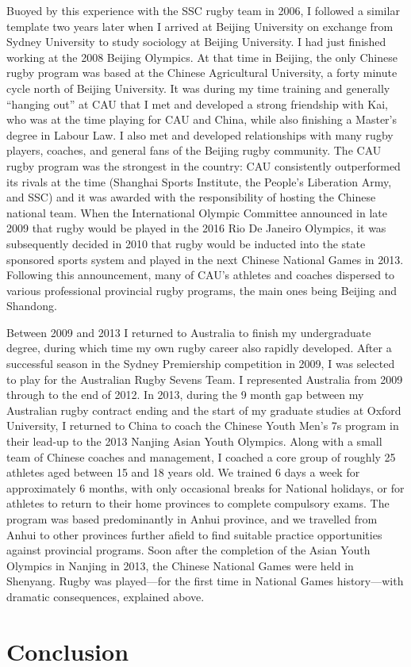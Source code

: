 \begin{CJK}{UTF8}{gbsn}
    Buoyed by this experience with the SSC rugby team in 2006, I followed a similar template two years later when I arrived at Beijing University on exchange from Sydney University to study sociology at Beijing University.  I had just finished working at the 2008 Beijing Olympics. At that time in Beijing, the only Chinese rugby program was based at the Chinese Agricultural University, a forty minute cycle north of Beijing University.  It was during my time training and generally ``hanging out'' at CAU that I met and developed a strong friendship with Kai, who was at the time playing for CAU and China, while also finishing a Master's degree in Labour Law.  I also met and developed relationships with many rugby players, coaches, and general fans of the Beijing rugby community.  The CAU rugby program was the strongest in the country: CAU consistently outperformed its rivals at the time (Shanghai Sports Institute, the People's Liberation Army, and SSC) and it was awarded with the responsibility of hosting the Chinese national team.  When the International Olympic Committee announced in late 2009 that rugby would be played in the 2016 Rio De Janeiro Olympics, it was subsequently decided in 2010 that rugby would be inducted into the state sponsored sports system and played in the next Chinese National Games in 2013.  Following this announcement, many of CAU's athletes and coaches dispersed to various professional provincial rugby programs, the main ones being Beijing and Shandong.

    Between 2009 and 2013 I returned to Australia to finish my undergraduate degree, during which time my own rugby career also rapidly developed.  After a successful season in the Sydney Premiership competition in 2009, I was selected to play for the Australian Rugby Sevens Team. I represented Australia from 2009 through to the end of 2012.  In 2013, during the 9 month gap between my Australian rugby contract ending and the start of my graduate studies at Oxford University, I returned to China to coach the Chinese Youth Men's 7s program in their lead-up to the 2013 Nanjing Asian Youth Olympics.  Along with a small team of Chinese coaches and management, I coached a core group of roughly 25 athletes aged between 15 and 18 years old. We trained 6 days a week for approximately 6 months, with only occasional breaks for National holidays, or for athletes to return to their home provinces to complete compulsory exams.  The program was based predominantly in Anhui province, and we travelled from Anhui to other provinces further afield to find suitable practice opportunities against provincial programs.  Soon after the completion of the Asian Youth Olympics in Nanjing in 2013, the Chinese National Games were held in Shenyang. Rugby was played---for the first time in National Games history---with dramatic consequences, explained above.




\section{Conclusion}

                                                          \end{CJK}
